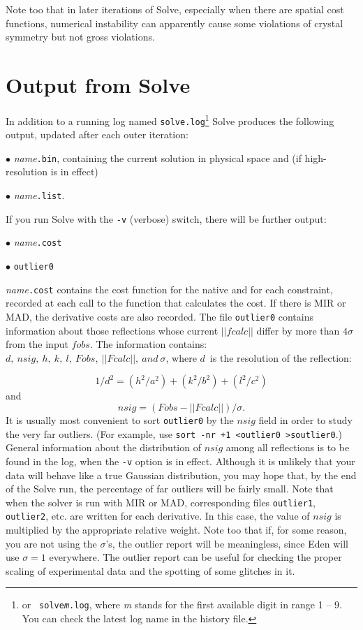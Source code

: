 \documentclass{report}
\begin{document}
Note too that in later iterations of Solve, especially 
when there are spatial cost functions,
numerical instability can apparently cause some violations of
crystal symmetry but not gross violations.

\section {Output from Solve}
\label{solver-output}

In addition to a running log named {\tt solve.log}\footnote {or {\tt 
solve{\it m}.log}, where {\it m} stands for the first available digit 
in range 1 -- 9.  You can check the latest log name in the history file.}
Solve produces the following output, updated after each outer iteration:

$\bullet$ {\it name}{\tt.bin}, containing the 
current solution in physical space and (if high-resolution is in effect)

$\bullet$ {\it name}{\tt.list}.

\vspace {0.1in}

If you run Solve with the {\tt -v} (verbose) switch, there will be further output:

$\bullet$ {\it name}{\tt.cost}

$\bullet$ {\tt outlier0}

{\it name}{\tt.cost} contains the cost function for the native
and for each constraint, recorded at each call to the function that calculates
the cost.  If there is MIR or MAD, the derivative costs are also recorded.
The file {\tt outlier0} contains information about those reflections whose 
current $||fcalc||$  differ by more than $4\sigma$ from the input
$fobs$.  The information contains:  $d,~nsig,~
h,~ k,~ l,~ Fobs,~ ||Fcalc||,~ and~\sigma$, where
$d$~is the resolution of the reflection:

$$ 1/d^2 = (h^2/a^2) + (k^2/b^2) + (l^2/c^2) $$
and
$$ nsig = (Fobs - ||Fcalc||) / \sigma. $$
It is usually most convenient to sort {\tt outlier0} by the $nsig$ field in
order to study the very far outliers.  
(For example, use {\tt sort -nr +1 <outlier0 >soutlier0}.)
General information about the distribution of $nsig$ among all reflections is
to be found in the log, when the {\tt -v} option is in effect.  Although it
is unlikely that your data will behave like a true Gaussian distribution, 
you may hope that, by the end of the Solve run, the percentage of far outliers 
will be fairly small.
Note that when the solver is run with MIR or MAD, corresponding 
files {\tt outlier1}, {\tt outlier2}, etc. are written for each derivative.
In this case, the value of $nsig$ is multiplied by the appropriate relative 
weight.  Note too that if, for some reason, you are not using the $\sigma$'s, 
the outlier report will be meaningless, since Eden will use $\sigma = 1$ 
everywhere.  The outlier report can be useful for checking the proper scaling
of experimental data and the spotting of some glitches in it.
\end{document}
